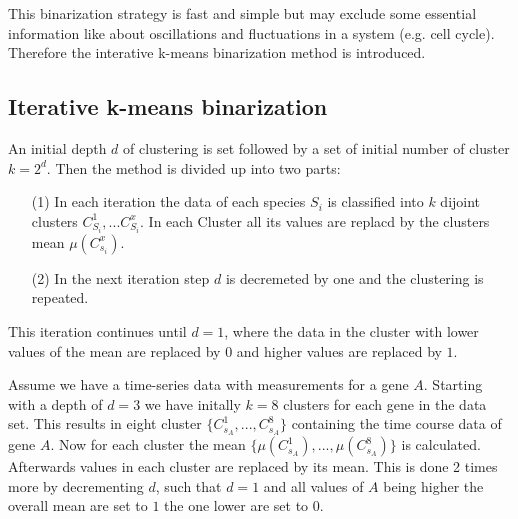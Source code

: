 This binarization strategy is fast and simple but may exclude some essential information like about oscillations and fluctuations in a system (e.g. cell cycle). Therefore the interative k-means binarization method is introduced.



\subsection*{Iterative k-means binarization}

An initial depth $d$ of clustering is set followed by a set of initial number of cluster $k=2^d$. Then the method is divided up into two parts:

\begin{itemize}
\item[(1)] In each iteration the data of each species $S_{i}$  is classified into $k$ dijoint clusters $ C_{S{_i}}^{1},...C_{S{_i}}^{x}$. In each Cluster all its values are replacd by the clusters mean $\mu(C_{s_{i}}^{x})$.
\item[(2)]  In the next iteration step $d$ is decremeted by one and the clustering is repeated.
\end{itemize}

This iteration continues until $d=1$, where the data in the cluster with lower values of the mean are replaced by $0$ and higher values are replaced by $1$.



\begin{exmp}Assume we have a time-series data with measurements for a gene $A$. Starting with a depth of $d=3$ we have initally $k=8$ clusters for each gene in the data set. This results in eight cluster $\{C_{s{_A}}^{1},...,C_{s{_A}}^{8}\}$ containing the time course data of gene $A$. Now for each cluster the mean $\{\mu(C_{s_{A}}^{1}),...,\mu(C_{s_{A}}^{8})\}$ is calculated. Afterwards values in each cluster are replaced by its mean. This is done 2 times more by decrementing $d$, such that $d=1$ and all values of $A$ being higher the overall mean are set to $1$ the one lower are set to $0$. \end{exmp}



